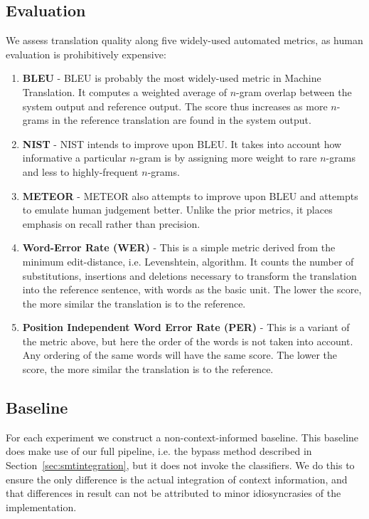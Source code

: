 \documentclass[smallextended]{svjour3}       %
\theoremstyle{break}
\begin{document}


\subsection{Evaluation}

We assess translation quality along five widely-used automated metrics,
as human evaluation is prohibitively expensive:

\begin{enumerate} %
\item \textbf{BLEU} - BLEU \citep{BLEU} is probably the most widely-used metric
in Machine Translation. It computes a weighted average of $n$-gram overlap
between the system output and reference output. The score thus increases as
more $n$-grams in the reference translation are found in the system output.
\item \textbf{NIST} - NIST intends to improve upon BLEU. It takes into account
how informative a particular $n$-gram is by assigning more weight to rare
$n$-grams and less to highly-frequent $n$-grams.  
\item \textbf{METEOR} - METEOR \citep{METEOR} also attempts to improve upon
  BLEU and attempts to emulate human judgement better. Unlike the prior
  metrics, it places emphasis on recall rather than precision.
\item \textbf{Word-Error Rate (WER)} - This is a simple metric derived from the
minimum edit-distance, i.e. Levenshtein, algorithm. It counts the number of
substitutions, insertions and deletions necessary to transform the translation
into the reference sentence, with words as the basic unit. The lower
the score, the more similar the translation is to the reference.  
\item \textbf{Position Independent Word Error Rate (PER)} - This is a variant of the
metric above, but here the order of the words is not taken into account. Any
ordering of the same words will have the same score. The lower the score, the
more similar the translation is to the reference.
\end{enumerate}

\subsection{Baseline}

For each experiment we construct a non-context-informed baseline. This
baseline does make use of our full pipeline, i.e. the bypass method described
in Section~\ref{sec:smtintegration}, but it does not invoke the
classifiers.  We do this to ensure the only difference is the actual
integration of context information, and that differences in result can not be
attributed to minor idiosyncrasies of the implementation.
\end{document}
